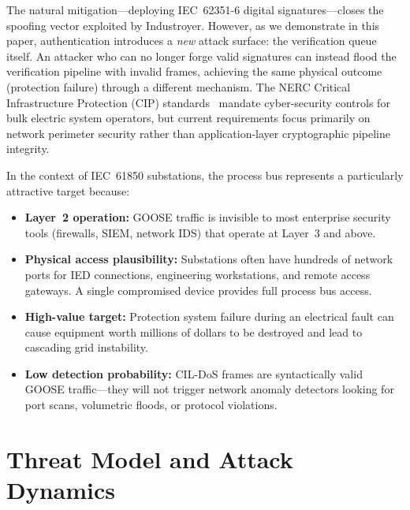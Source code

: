 \documentclass[journal]{IEEEtran}
\begin{document}
The natural mitigation---deploying IEC~62351-6 digital signatures---closes the spoofing vector exploited by Industroyer. However, as we demonstrate in this paper, authentication introduces a \emph{new} attack surface: the verification queue itself. An attacker who can no longer forge valid signatures can instead flood the verification pipeline with invalid frames, achieving the same physical outcome (protection failure) through a different mechanism. The NERC Critical Infrastructure Protection (CIP) standards~\cite{nerc_cip_v7} mandate cyber-security controls for bulk electric system operators, but current requirements focus primarily on network perimeter security rather than application-layer cryptographic pipeline integrity.

In the context of IEC~61850 substations, the process bus represents a particularly attractive target because:
\begin{itemize}[leftmargin=*]
    \item \textbf{Layer~2 operation:} GOOSE traffic is invisible to most enterprise security tools (firewalls, SIEM, network IDS) that operate at Layer~3 and above.
    \item \textbf{Physical access plausibility:} Substations often have hundreds of network ports for IED connections, engineering workstations, and remote access gateways. A single compromised device provides full process bus access.
    \item \textbf{High-value target:} Protection system failure during an electrical fault can cause equipment worth millions of dollars to be destroyed and lead to cascading grid instability.
    \item \textbf{Low detection probability:} CIL-DoS frames are syntactically valid GOOSE traffic---they will not trigger network anomaly detectors looking for port scans, volumetric floods, or protocol violations.
\end{itemize}

\section{Threat Model and Attack Dynamics}
\end{document}
